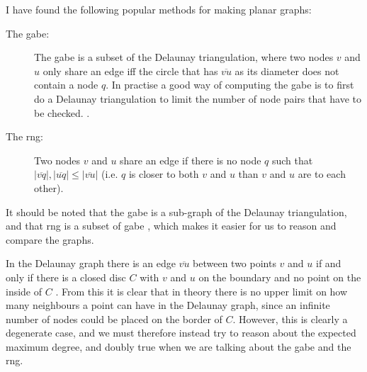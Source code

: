I have found the following popular methods for making planar graphs:
\begin{description}
\item[The \ac{gabe}:] The \ac{gabe} is a subset of the Delaunay triangulation, where two nodes $v$ and $u$ only share an edge iff the circle that has $\overline{vu}$ as its diameter does not contain a node $q$. In practise a good way of computing the \ac{gabe} is to first do a Delaunay triangulation to limit the number of node pairs that have to be checked.
\cite{gpsr, gopher}. 
\item[The \ac{rng}:] Two nodes $v$ and $u$ share an edge if there is no node $q$ such that $|\overline{vq}|, |\overline{uq}| \leq |\overline{vu}|$ (i.e. $q$ is closer to both $v$ and $u$ than $v$ and $u$ are to each other). \cite{gpsr, RNG}
\end{description}

\label{del_gabe_rng_neigh}It should be noted that the \ac{gabe} is a sub-graph of the Delaunay triangulation\cite{GGExpected}, and that \ac{rng} is a subset of \ac{gabe} \cite{GGExpected}, which makes it easier for us to reason and compare the graphs.


In the Delaunay graph there is an edge $\overline{vu}$ between two points $v$ and $u$ if and only if there is a closed disc $C$ with $v$ and $u$ on the boundary and no point on the inside of $C$ \cite{CompuGeo}. From this it is clear that in theory there is no upper limit on how many neighbours a point can have in the Delaunay graph, since an infinite number of nodes could be placed on the border of $C$. However, this is clearly a degenerate case, and we must therefore instead try to reason about the expected maximum degree, and doubly true when we are talking about the \ac{gabe} and the \ac{rng}.

